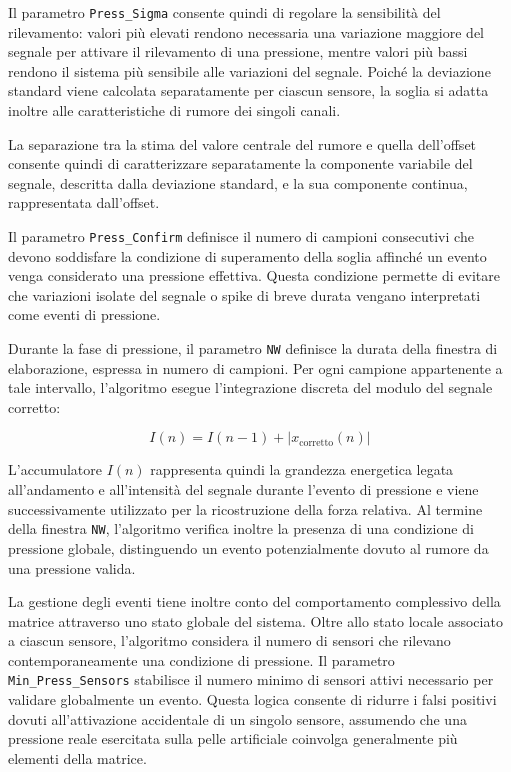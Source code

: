 \documentclass[10pt, a4paper]{article}
\begin{document}
                Il parametro \texttt{Press\_Sigma} consente quindi di regolare la sensibilità del rilevamento: valori più elevati rendono necessaria una variazione maggiore del segnale per attivare il 
                rilevamento di una pressione, mentre valori più bassi rendono il sistema più sensibile alle variazioni del segnale. Poiché la deviazione standard viene calcolata separatamente per 
                ciascun sensore, la soglia si adatta inoltre alle caratteristiche di rumore dei singoli canali.

                La separazione tra la stima del valore centrale del rumore e quella dell'offset consente quindi di caratterizzare separatamente la componente variabile del segnale, 
                descritta dalla deviazione standard, e la sua componente continua, rappresentata dall'offset.

                Il parametro \texttt{Press\_Confirm} definisce il numero di campioni consecutivi che devono soddisfare la condizione di superamento della soglia affinché un evento venga
                considerato una pressione effettiva. Questa condizione permette di evitare che variazioni isolate del segnale o spike di breve durata vengano interpretati come eventi di pressione.

                Durante la fase di pressione, il parametro \texttt{NW} definisce la durata della finestra di elaborazione, espressa in numero di campioni. Per ogni campione appartenente a 
                tale intervallo, l'algoritmo esegue l'integrazione discreta del modulo del segnale corretto:

                    \begin{equation}
                        I(n) = I(n-1) + |x_{\mathrm{corretto}}(n)|
                    \end{equation}

                L'accumulatore $I(n)$ rappresenta quindi la grandezza energetica legata all'andamento e all'intensità del segnale durante l'evento di pressione e viene successivamente utilizzato per 
                la ricostruzione della forza relativa. Al termine della finestra \texttt{NW}, l'algoritmo verifica inoltre la presenza di una condizione di pressione globale, 
                distinguendo un evento potenzialmente dovuto al rumore da una pressione valida.

                La gestione degli eventi tiene inoltre conto del comportamento complessivo della matrice attraverso uno stato globale del sistema. Oltre allo stato locale associato a ciascun sensore, 
                l'algoritmo considera il numero di sensori che rilevano contemporaneamente una condizione di pressione. Il parametro \texttt{Min\_Press\_Sensors} stabilisce il numero minimo di 
                sensori attivi necessario per validare globalmente un evento. Questa logica consente di ridurre i falsi positivi dovuti all'attivazione accidentale di un singolo sensore, assumendo
                che una pressione reale esercitata sulla pelle artificiale coinvolga generalmente più elementi della matrice.
\end{document}
